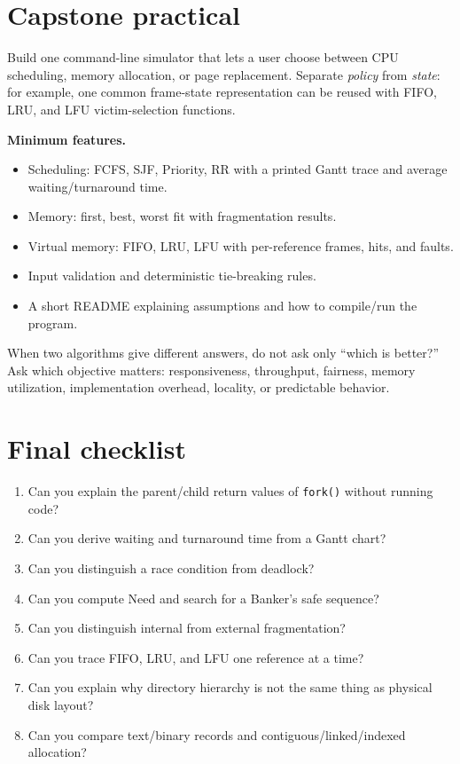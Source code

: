 \section*{Capstone practical}
Build one command-line simulator that lets a user choose between CPU scheduling, memory allocation, or page replacement. Separate \emph{policy} from \emph{state}: for example, one common frame-state representation can be reused with FIFO, LRU, and LFU victim-selection functions.

\begin{miniproject}
\textbf{Minimum features.}
\begin{itemize}
  \item Scheduling: FCFS, SJF, Priority, RR with a printed Gantt trace and average waiting/turnaround time.
  \item Memory: first, best, worst fit with fragmentation results.
  \item Virtual memory: FIFO, LRU, LFU with per-reference frames, hits, and faults.
  \item Input validation and deterministic tie-breaking rules.
  \item A short README explaining assumptions and how to compile/run the program.
\end{itemize}
\end{miniproject}

\begin{decisionmemo}
When two algorithms give different answers, do not ask only ``which is better?'' Ask which objective matters: responsiveness, throughput, fairness, memory utilization, implementation overhead, locality, or predictable behavior.
\end{decisionmemo}

\section*{Final checklist}
\begin{quickcheck}
\begin{enumerate}
  \item Can you explain the parent/child return values of \texttt{fork()} without running code?
  \item Can you derive waiting and turnaround time from a Gantt chart?
  \item Can you distinguish a race condition from deadlock?
  \item Can you compute Need and search for a Banker's safe sequence?
  \item Can you distinguish internal from external fragmentation?
  \item Can you trace FIFO, LRU, and LFU one reference at a time?
  \item Can you explain why directory hierarchy is not the same thing as physical disk layout?
  \item Can you compare text/binary records and contiguous/linked/indexed allocation?
\end{enumerate}
\end{quickcheck}

